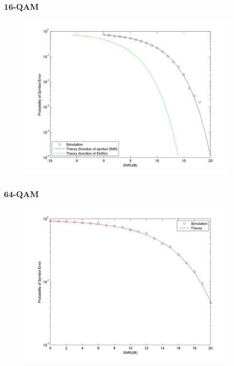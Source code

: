\documentclass[]{article}
\begin{document}
\subsubsection{16-QAM}
\begin{figure}[H]
\centering
\hspace*{-2cm}\includegraphics[width=1.3\textwidth]{qam16SNR.jpg}
\caption{}
\end{figure}
\subsubsection{64-QAM}
\begin{figure}[H]
\centering
\hspace*{-2cm}\includegraphics[width=1.3\textwidth]{qam64SNR.jpg}
\caption{}
\end{figure}
\end{document}
